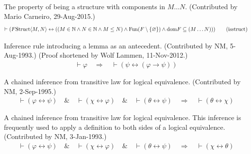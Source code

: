 \begin{lemma} The property of being a structure with
components in $M \ldots N$.
     (Contributed by Mario Carneiro, 29-Aug-2015.)
\begin{align}
\vdash ( F {\rm Struct} \langle M , N \rangle \leftrightarrow ( ( M \in
    \mathbb{N} \wedge N \in \mathbb{N} \wedge M \le N ) \wedge {\rm Fun} ( F
    \setminus \{ \varnothing \} ) \wedge {\rm dom} F \subseteq ( M \ldots N ) )
    )\label{eq:isstruct}\tag{isstruct}
\end{align}
\end{lemma}


\begin{lemma} Inference rule introducing a lemma as an antecedent.  (Contributed by
       NM, 5-Aug-1993.)  (Proof shortened by Wolf Lammen, 11-Nov-2012.)
\begin{align}
\vdash \varphi\quad\Rightarrow\quad \vdash ( \psi \leftrightarrow ( \varphi \rightarrow \psi ) )\label{eq:a1bi}\tag{a1bi}
\end{align}
\end{lemma}


\begin{lemma} A chained inference from transitive law for logical equivalence.
       (Contributed by NM, 2-Sep-1995.)
\begin{align}
\vdash ( \varphi \leftrightarrow \psi )\quad\&\quad \vdash ( \chi \leftrightarrow \varphi )\quad\&\quad \vdash ( \theta \leftrightarrow \psi )\quad\Rightarrow\quad \vdash ( \theta \leftrightarrow \chi
    )\label{eq:3bitr4ri}\tag{3bitr4ri}
\end{align}
\end{lemma}


\begin{lemma} A chained inference from transitive law for logical equivalence.  This
       inference is frequently used to apply a definition to both sides of a
       logical equivalence.  (Contributed by NM, 3-Jan-1993.)
\begin{align}
\vdash ( \varphi \leftrightarrow \psi )\quad\&\quad \vdash ( \chi \leftrightarrow \varphi )\quad\&\quad \vdash ( \theta \leftrightarrow \psi )\quad\Rightarrow\quad \vdash ( \chi \leftrightarrow \theta
    )\label{eq:3bitr4i}\tag{3bitr4i}
\end{align}
\end{lemma}


